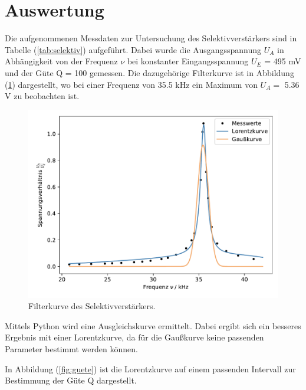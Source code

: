 \newpage
\section{Auswertung}
\noindent
Die aufgenommenen Messdaten zur Untersuchung des Selektivverstärkers sind in Tabelle (\ref{tab:selektiv}) aufgeführt.
Dabei wurde die Ausgangsspannung $U_A$ in Abhängigkeit von der Frequenz $\nu$ bei konstanter Eingangsspannung $U_E$ = 495 mV und der Güte Q = 100 gemessen.
Die dazugehörige Filterkurve ist in Abbildung (\ref{fig:selektiv}) dargestellt, 
wo bei einer Frequenz von 35.5 kHz ein Maximum von $U_A =$ 5.36 V
zu beobachten ist.

\begin{figure}
    \centering
       \includegraphics[width=\textwidth]{Daten/x6.pdf}
       \caption{Filterkurve des Selektivverstärkers.}
       \label{fig:selektiv}
\end{figure}

\noindent
Mittels Python wird eine Ausgleichskurve ermittelt.
Dabei ergibt sich ein besseres Ergebnis mit einer Lorentzkurve, da für die Gaußkurve keine passenden Parameter bestimmt werden können.

\noindent
In Abbildung (\ref{fig:guete}) ist die Lorentzkurve auf einem passenden Intervall zur Bestimmung der Güte Q dargestellt.

